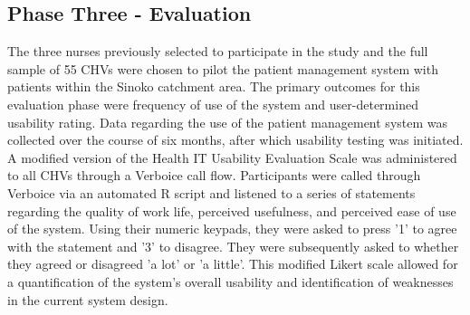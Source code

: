 \subsection{Phase Three - Evaluation}
The three nurses previously selected to participate in the study and the full sample of 55 CHVs were chosen to pilot the patient management system with patients within the Sinoko catchment area. The primary outcomes for this evaluation phase were frequency of use of the system and user-determined usability rating. Data regarding the use of the patient management system was collected over the course of six months, after which usability testing was initiated. A modified version of the Health IT Usability Evaluation Scale \citep{Yen2010} was administered to all CHVs through a Verboice call flow. Participants were called through Verboice via an automated R script and listened to a series of statements regarding the quality of work life, perceived usefulness, and perceived ease of use of the system. Using their numeric keypads, they were asked to press '1' to agree with the statement and '3' to disagree. They were subsequently asked to whether they agreed or disagreed 'a lot' or 'a little'. This modified Likert scale allowed for a quantification of the system's overall usability and identification of weaknesses in the current system design. 


